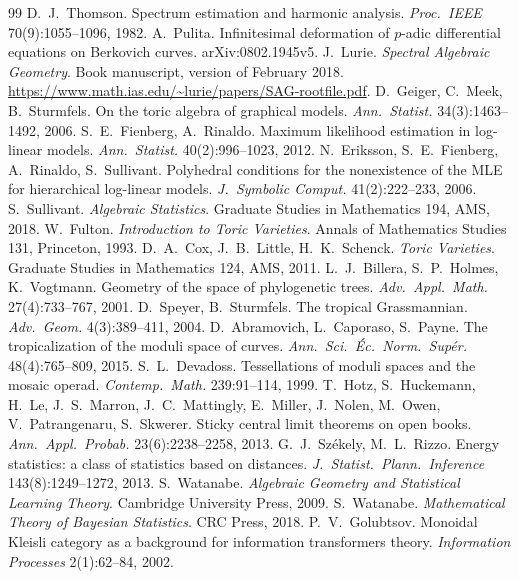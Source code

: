 \documentclass[11pt]{article}
\theoremstyle{definition}
\theoremstyle{remark}
\begin{document}
\begin{thebibliography}{99}
 D.~J.~Thomson. Spectrum estimation and harmonic analysis. \emph{Proc.\ IEEE} 70(9):1055--1096, 1982.
 A.~Pulita. Infinitesimal deformation of $p$-adic differential equations on Berkovich curves. arXiv:0802.1945v5.
 J.~Lurie. \emph{Spectral Algebraic Geometry}. Book manuscript, version of February 2018. \url{https://www.math.ias.edu/~lurie/papers/SAG-rootfile.pdf}.
 D.~Geiger, C.~Meek, B.~Sturmfels. On the toric algebra of graphical models. \emph{Ann.\ Statist.} 34(3):1463--1492, 2006.
 S.~E.~Fienberg, A.~Rinaldo. Maximum likelihood estimation in log-linear models. \emph{Ann.\ Statist.} 40(2):996--1023, 2012.
 N.~Eriksson, S.~E.~Fienberg, A.~Rinaldo, S.~Sullivant. Polyhedral conditions for the nonexistence of the MLE for hierarchical log-linear models. \emph{J.\ Symbolic Comput.} 41(2):222--233, 2006.
 S.~Sullivant. \emph{Algebraic Statistics}. Graduate Studies in Mathematics 194, AMS, 2018.
 W.~Fulton. \emph{Introduction to Toric Varieties}. Annals of Mathematics Studies 131, Princeton, 1993.
 D.~A.~Cox, J.~B.~Little, H.~K.~Schenck. \emph{Toric Varieties}. Graduate Studies in Mathematics 124, AMS, 2011.
 L.~J.~Billera, S.~P.~Holmes, K.~Vogtmann. Geometry of the space of phylogenetic trees. \emph{Adv.\ Appl.\ Math.} 27(4):733--767, 2001.
 D.~Speyer, B.~Sturmfels. The tropical Grassmannian. \emph{Adv.\ Geom.} 4(3):389--411, 2004.
 D.~Abramovich, L.~Caporaso, S.~Payne. The tropicalization of the moduli space of curves. \emph{Ann.\ Sci.\ \'Ec.\ Norm.\ Sup\'er.} 48(4):765--809, 2015.
 S.~L.~Devadoss. Tessellations of moduli spaces and the mosaic operad. \emph{Contemp.\ Math.} 239:91--114, 1999.
 T.~Hotz, S.~Huckemann, H.~Le, J.~S.~Marron, J.~C.~Mattingly, E.~Miller, J.~Nolen, M.~Owen, V.~Patrangenaru, S.~Skwerer. Sticky central limit theorems on open books. \emph{Ann.\ Appl.\ Probab.} 23(6):2238--2258, 2013.
 G.~J.~Sz\'ekely, M.~L.~Rizzo. Energy statistics: a class of statistics based on distances. \emph{J.\ Statist.\ Plann.\ Inference} 143(8):1249--1272, 2013.
 S.~Watanabe. \emph{Algebraic Geometry and Statistical Learning Theory}. Cambridge University Press, 2009.
 S.~Watanabe. \emph{Mathematical Theory of Bayesian Statistics}. CRC Press, 2018.
 P.~V.~Golubtsov. Monoidal Kleisli category as a background for information transformers theory. \emph{Information Processes} 2(1):62--84, 2002.

\end{thebibliography}
\end{document}
